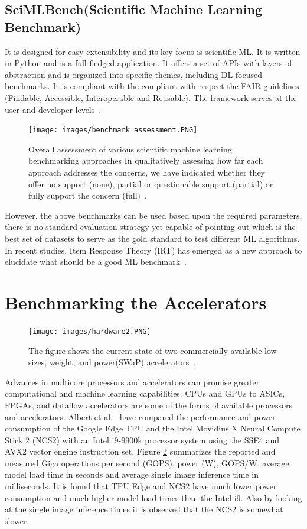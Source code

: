 \documentclass[a4paper,UKenglish,cleveref, autoref, thm-restate]{lipics-v2021}
\begin{document}
\subsection{SciMLBench(Scientific Machine Learning Benchmark)}
\label{SciMLBench}
It is designed for easy extensibility and its key focus is scientific ML. It is written in Python and is a full-fledged application. It offers a set of APIs with layers of abstraction and is organized into specific themes, including DL-focused benchmarks. It is compliant with the compliant with respect the FAIR guidelines (Findable, Accessible, Interoperable and Reusable). The framework serves at the user and developer levels~\cite{RefWorksdawnBench:}.

\begin{figure}[ht]
    \centering
    \texttt{[image: images/benchmark assessment.PNG]}
    \caption{ Overall assessment of various scientific machine learning benchmarking approaches
 In qualitatively assessing how far each approach addresses the concerns, we have indicated whether they offer no support (none), partial or questionable support
(partial) or fully support the concern (full)~\cite{sctmlb}.}
    \label{fig:benchmarkassessment}
\end{figure}

However, the above benchmarks can be used based upon the required parameters, there is no standard evaluation strategy yet capable of pointing out which is the best set of datasets to serve
as the gold standard to test different ML algorithms. In recent studies, Item
Response Theory (IRT) has emerged as a new approach to elucidate what
should be a good ML benchmark~\cite{decodingmlb}. 

\section{Benchmarking the Accelerators}
\label{Benchmarking the accelerators}
\begin{figure}[ht]
    \centering
    \texttt{[image: images/hardware2.PNG]}
    \caption{  The figure shows the current state of
 two commercially available low sizes, weight, and power(SWaP) accelerators~\cite{accele}.}
    \label{fig:hardware2}
\end{figure}
Advances in multicore processors and accelerators can promise greater computational and machine learning capabilities. CPUs and GPUs to ASICs, FPGAs, and dataflow accelerators are some of the forms of available processors and accelerators. Albert et al.~\cite{accele} have compared the performance and power consumption of the Google Edge TPU and the Intel
Movidius X Neural Compute Stick 2 (NCS2) with an Intel i9-9900k
processor system using the SSE4 and AVX2 vector engine instruction set. 
Figure \ref{fig:hardware2} summarizes
the reported and measured Giga operations per second (GOPS), power (W), GOPS/W, average model load time in seconds and average single image inference time
in milliseconds. It is found that TPU Edge and NCS2 have much lower power
consumption and much higher model load times than the Intel i9. Also by looking at the single image inference times it is observed that 
the NCS2 is somewhat slower.
\end{document}
